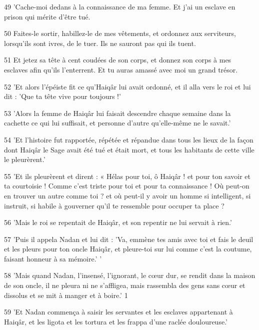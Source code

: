 \par 49 'Cache-moi dedans à la connaissance de ma femme. Et j'ai un esclave en prison qui mérite d'être tué.

\par 50 Faites-le sortir, habillez-le de mes vêtements, et ordonnez aux serviteurs, lorsqu'ils sont ivres, de le tuer. Ils ne sauront pas qui ils tuent.

\par 51 Et jetez sa tête à cent coudées de son corps, et donnez son corps à mes esclaves afin qu'ils l'enterrent. Et tu auras amassé avec moi un grand trésor.

\par 52 'Et alors l'épéiste fit ce qu'Haiqâr lui avait ordonné, et il alla vers le roi et lui dit : 'Que ta tête vive pour toujours !'

\par 53 'Alors la femme de Haiqâr lui faisait descendre chaque semaine dans la cachette ce qui lui suffisait, et personne d'autre qu'elle-même ne le savait.'

\par 54 'Et l'histoire fut rapportée, répétée et répandue dans tous les lieux de la façon dont Haiqâr le Sage avait été tué et était mort, et tous les habitants de cette ville le pleurèrent.'

\par 55 'Et ils pleurèrent et dirent : « Hélas pour toi, ô Haiqâr ! et pour ton savoir et ta courtoisie ! Comme c'est triste pour toi et pour ta connaissance ! Où peut-on en trouver un autre comme toi ? et où peut-il y avoir un homme si intelligent, si instruit, si habile à gouverner qu'il te ressemble pour occuper ta place ?

\par 56 'Mais le roi se repentait de Haiqâr, et son repentir ne lui servait à rien.'

\par 57 'Puis il appela Nadan et lui dit : 'Va, emmène tes amis avec toi et fais le deuil et les pleurs pour ton oncle Haiqâr, et pleure-toi sur lui comme c'est la coutume, faisant honneur à sa mémoire.' '

\par 58 'Mais quand Nadan, l'insensé, l'ignorant, le cœur dur, se rendit dans la maison de son oncle, il ne pleura ni ne s'affligea, mais rassembla des gens sans cœur et dissolus et se mit à manger et à boire.' 1

\par 59 'Et Nadan commença à saisir les servantes et les esclaves appartenant à Haiqâr, et les ligota et les tortura et les frappa d'une raclée douloureuse.'

